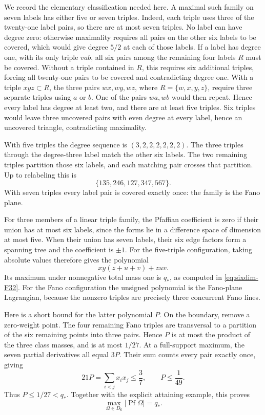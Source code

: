 We record the elementary classification needed here. A maximal such family
on seven labels has either five or seven triples. Indeed, each triple uses
three of the twenty-one label pairs, so there are at most seven triples.
No label can have degree zero: otherwise maximality requires all pairs on
the other six labels to be covered, which would give degree $5/2$ at each
of those labels. If a label has degree one, with its only triple $vab$,
all six pairs among the remaining four labels $R$ must be covered.
Without a triple contained in $R$, this requires six additional triples,
forcing all twenty-one pairs to be covered and contradicting degree one.
With a triple $xyz\subset R$, the three pairs $wx,wy,wz$, where
$R=\{w,x,y,z\}$, require three separate triples using $a$ or $b$.
One of the pairs $wa,wb$ would then repeat. Hence every label has degree
at least two, and there are at least five triples. Six triples would leave
three uncovered pairs with even degree at every label, hence an uncovered
triangle, contradicting maximality.

With five triples the degree sequence is $(3,2,2,2,2,2,2)$. The three
triples through the degree-three label match the other six labels. The two
remaining triples partition those six labels, and each matching pair crosses
that partition. Up to relabeling this is
\[
 \{135,246,127,347,567\}.
\]
With seven triples every label pair is covered exactly once: the family is
the Fano plane.

For three members of a linear triple family, the Pfaffian coefficient is
zero if their union has at most six labels, since the forms lie in a
difference space of dimension at most five. When their union has seven
labels, their six edge factors form a spanning tree and the coefficient is
$\pm1$. For the five-triple configuration, taking absolute values therefore
gives the polynomial
\[
 xy(z+u+v)+zuv.
\]
Its maximum under nonnegative total mass one is $q_*$, as computed in
\eqref{eq:sixdim-F32}. For the Fano configuration the unsigned polynomial
is the Fano-plane Lagrangian, because the nonzero triples are precisely
three concurrent Fano lines.

Here is a short bound for the latter polynomial $P$. On the boundary,
remove a zero-weight point. The four remaining Fano triples are transversal
to a partition of the six remaining points into three pairs. Hence $P$ is
at most the product of the three class masses, and is at most $1/27$.
At a full-support maximum, the seven partial derivatives all equal $3P$.
Their sum counts every pair exactly once, giving
\[
 21P=\sum_{i<j}x_ix_j\le\frac37,
 \qquad P\le\frac1{49}.
\]
Thus $P\le1/27<q_*$. Together with the explicit attaining example, this
proves
\begin{equation}\label{eq:sixdim-ranktwo-bound}
 \max_{\Omega\in D_6}|\operatorname{Pf}\Omega|=q_*.
\end{equation}

